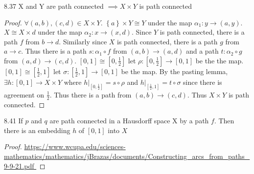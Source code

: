 \documentclass{article}
\begin{document}
\bigskip

\begin{claim}{8.37}\label{Claim 8.37.}
    X and Y are path connected $\implies X \times Y$ is path connected   
\end{claim}
\begin{proof}
    $\forall (a, b), (c, d) \in X \times Y$. $\left\{ a \right\} \times Y \cong Y$ under the map $\alpha_1: y \to (a, y)$. $X \cong X \times {d}$ under the map $\alpha_2: x \to (x, d)$. Since $Y$ is path connected, there is a path $f$ from $b \to d$. Similarly since $X$ is path connected, there is a path $g$ from $a \to c$. Thus there is a path $s: \alpha_1 \circ f$  from $(a, b) \to (a, d)$ and a path $t: \alpha_2 \circ g$ from $(a, d) \to (c, d)$. $[0, 1] \cong [0, \frac{1}{2}]$ let $\rho: [0, \frac{1}{2}] \to [0, 1]$ be the the map. $[0, 1] \cong [\frac{1}{2}, 1]$ let $\sigma: [\frac{1}{2}, 1] \to [0, 1]$ be the map. By the pasting lemma, $\exists h: [0, 1] \to X \times Y$ where $h|_{[0, \frac{1}{2}]} = s \circ \rho$ and $h|_{[\frac{1}{2}, 1]} = t \circ \sigma$ since there is agreement on $\frac{1}{2}$. Thus there is a path from $(a, b) \to (c,d)$. Thus $X \times Y$ is path connected.    
\end{proof}

\bigskip

\begin{claim}{8.41}\label{Claim 8.41.}
    If $p$ and $q$ are path connected in a Hausdorff space X by a path $f$. Then there is an embedding $h$ of $[0, 1]$ into $X$    
\end{claim}
\begin{proof}
\url{    https://www.wcupa.edu/sciences-mathematics/mathematics/jBrazas/documents/Constructing_arcs_from_paths_9-9-21.pdf
}

\end{proof}
\end{document}
